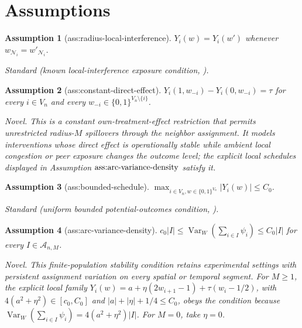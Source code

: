 \documentclass{article}
\newtheorem{assumption}{Assumption}
\begin{document}
\section{Assumptions}

\begin{assumption}[ass:radius-local-interference]\label{ass:radius-local-interference}
\(Y_i(w)=Y_i(w')\) whenever \(w_{\mathcal N_i}=w'_{\mathcal N_i}\).
\par\smallskip\noindent\emph{Standard} (known local-interference exposure condition, \cite{AronowSamii2017}).
\end{assumption}

\begin{assumption}[ass:constant-direct-effect]\label{ass:constant-direct-effect}
\(Y_i(1,w_{-i})-Y_i(0,w_{-i})=\tau\) for every \(i\in V_n\) and every \(w_{-i}\in\{0,1\}^{V_n\setminus\{i\}}\).
\par\smallskip\noindent\emph{Novel.} This is a constant own-treatment-effect restriction that permits unrestricted radius-\(M\) spillovers through the neighbor assignment. It models interventions whose direct effect is operationally stable while ambient local congestion or peer exposure changes the outcome level; the explicit local schedules displayed in Assumption \(\textnormal{ass:arc-variance-density}\) satisfy it.
\end{assumption}

\begin{assumption}[ass:bounded-schedule]\label{ass:bounded-schedule}
\(\max_{i\in V_n,w\in\{0,1\}^{V_n}}|Y_i(w)|\le C_0\).
\par\smallskip\noindent\emph{Standard} (uniform bounded potential-outcomes condition, \cite{LinDing2025TimeSeries}).
\end{assumption}

\begin{assumption}[ass:arc-variance-density]\label{ass:arc-variance-density}
\(c_0|I|\le\operatorname{Var}_W(\sum_{i\in I}\psi_i)\le C_0|I|\) for every \(I\in\mathcal A_{n,M}\).
\par\smallskip\noindent\emph{Novel.} This finite-population stability condition retains experimental settings with persistent assignment variation on every spatial or temporal segment. For \(M\ge1\), the explicit local family \(Y_i(w)=a+\eta(2w_{i+1}-1)+\tau(w_i-1/2)\), with \(4(a^2+\eta^2)\in[c_0,C_0]\) and \(|a|+|\eta|+1/4\le C_0\), obeys the condition because \(\operatorname{Var}_W(\sum_{i\in I}\psi_i)=4(a^2+\eta^2)|I|\). For \(M=0\), take \(\eta=0\).
\end{assumption}
\end{document}
